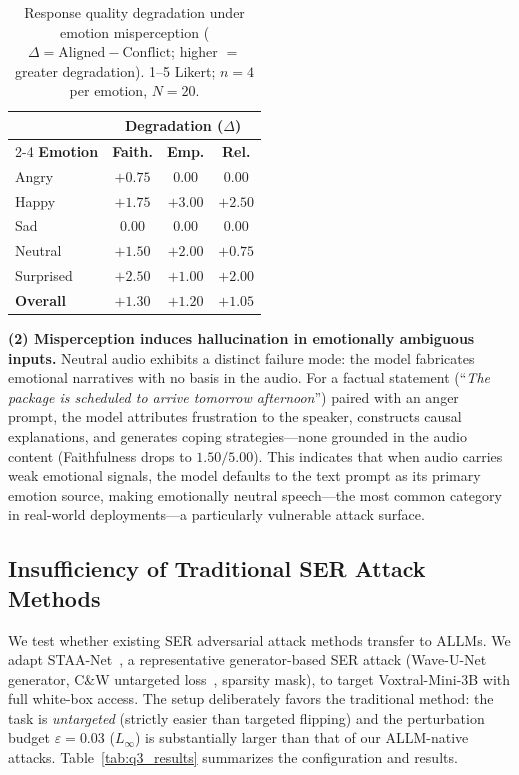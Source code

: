\documentclass[sigconf]{acmart}
\begin{document}
\begin{table}[t]
\centering
\caption{Response quality degradation under emotion misperception ($\Delta = \text{Aligned} - \text{Conflict}$; higher $=$ greater degradation). 1--5 Likert; $n{=}4$ per emotion, $N{=}20$.}
\label{tab:q2_results}
\begin{tabular}{lccc}
\toprule
 & \multicolumn{3}{c}{\textbf{Degradation} ($\Delta$)} \\
\cmidrule(lr){2-4}
\textbf{Emotion} & \textbf{Faith.} & \textbf{Emp.} & \textbf{Rel.} \\
\midrule
Angry     & $+0.75$ & $0.00$  & $0.00$  \\
Happy     & $+1.75$ & $+3.00$ & $+2.50$ \\
Sad       & $0.00$  & $0.00$  & $0.00$  \\
Neutral   & $+1.50$ & $+2.00$ & $+0.75$ \\
Surprised & $+2.50$ & $+1.00$ & $+2.00$ \\
\midrule
\textbf{Overall} & $\boldsymbol{+1.30}$ & $\boldsymbol{+1.20}$ & $\boldsymbol{+1.05}$ \\
\bottomrule
\end{tabular}
\end{table}

\textbf{(2) Misperception induces hallucination in emotionally ambiguous inputs.}
Neutral audio exhibits a distinct failure mode: the model fabricates emotional narratives with no basis in the audio. For a factual statement (``\textit{The package is scheduled to arrive tomorrow afternoon}'') paired with an anger prompt, the model attributes frustration to the speaker, constructs causal explanations, and generates coping strategies---none grounded in the audio content (Faithfulness drops to $1.50/5.00$). This indicates that when audio carries weak emotional signals, the model defaults to the text prompt as its primary emotion source, making emotionally neutral speech---the most common category in real-world deployments---a particularly vulnerable attack surface.

\subsection{Insufficiency of Traditional SER Attack Methods}
\label{sec:obs_q3}

We test whether existing SER adversarial attack methods transfer to ALLMs. We adapt STAA-Net~\cite{staanet}, a representative generator-based SER attack (Wave-U-Net generator, C\&W untargeted loss~\cite{cw}, sparsity mask), to target Voxtral-Mini-3B with full white-box access. The setup deliberately favors the traditional method: the task is \textit{untargeted} (strictly easier than targeted flipping) and the perturbation budget $\varepsilon = 0.03$ ($L_\infty$) is substantially larger than that of our ALLM-native attacks. Table~\ref{tab:q3_results} summarizes the configuration and results.
\end{document}

